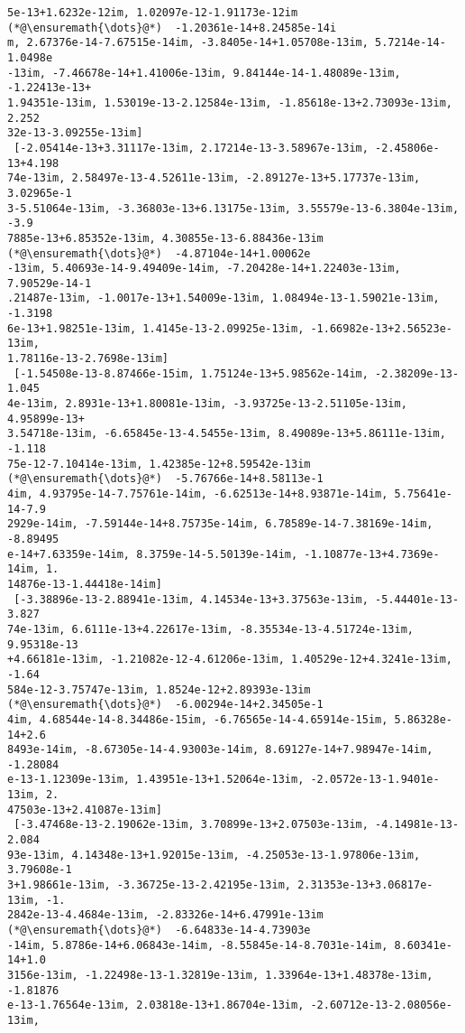 \documentclass[12pt,a4paper]{article}
\begin{document}
\begin{lstlisting}
5e-13+1.6232e-12im, 1.02097e-12-1.91173e-12im  (*@\ensuremath{\dots}@*)  -1.20361e-14+8.24585e-14i
m, 2.67376e-14-7.67515e-14im, -3.8405e-14+1.05708e-13im, 5.7214e-14-1.0498e
-13im, -7.46678e-14+1.41006e-13im, 9.84144e-14-1.48089e-13im, -1.22413e-13+
1.94351e-13im, 1.53019e-13-2.12584e-13im, -1.85618e-13+2.73093e-13im, 2.252
32e-13-3.09255e-13im]        
 [-2.05414e-13+3.31117e-13im, 2.17214e-13-3.58967e-13im, -2.45806e-13+4.198
74e-13im, 2.58497e-13-4.52611e-13im, -2.89127e-13+5.17737e-13im, 3.02965e-1
3-5.51064e-13im, -3.36803e-13+6.13175e-13im, 3.55579e-13-6.3804e-13im, -3.9
7885e-13+6.85352e-13im, 4.30855e-13-6.88436e-13im  (*@\ensuremath{\dots}@*)  -4.87104e-14+1.00062e
-13im, 5.40693e-14-9.49409e-14im, -7.20428e-14+1.22403e-13im, 7.90529e-14-1
.21487e-13im, -1.0017e-13+1.54009e-13im, 1.08494e-13-1.59021e-13im, -1.3198
6e-13+1.98251e-13im, 1.4145e-13-2.09925e-13im, -1.66982e-13+2.56523e-13im, 
1.78116e-13-2.7698e-13im]    
 [-1.54508e-13-8.87466e-15im, 1.75124e-13+5.98562e-14im, -2.38209e-13-1.045
4e-13im, 2.8931e-13+1.80081e-13im, -3.93725e-13-2.51105e-13im, 4.95899e-13+
3.54718e-13im, -6.65845e-13-4.5455e-13im, 8.49089e-13+5.86111e-13im, -1.118
75e-12-7.10414e-13im, 1.42385e-12+8.59542e-13im  (*@\ensuremath{\dots}@*)  -5.76766e-14+8.58113e-1
4im, 4.93795e-14-7.75761e-14im, -6.62513e-14+8.93871e-14im, 5.75641e-14-7.9
2929e-14im, -7.59144e-14+8.75735e-14im, 6.78589e-14-7.38169e-14im, -8.89495
e-14+7.63359e-14im, 8.3759e-14-5.50139e-14im, -1.10877e-13+4.7369e-14im, 1.
14876e-13-1.44418e-14im]     
 [-3.38896e-13-2.88941e-13im, 4.14534e-13+3.37563e-13im, -5.44401e-13-3.827
74e-13im, 6.6111e-13+4.22617e-13im, -8.35534e-13-4.51724e-13im, 9.95318e-13
+4.66181e-13im, -1.21082e-12-4.61206e-13im, 1.40529e-12+4.3241e-13im, -1.64
584e-12-3.75747e-13im, 1.8524e-12+2.89393e-13im  (*@\ensuremath{\dots}@*)  -6.00294e-14+2.34505e-1
4im, 4.68544e-14-8.34486e-15im, -6.76565e-14-4.65914e-15im, 5.86328e-14+2.6
8493e-14im, -8.67305e-14-4.93003e-14im, 8.69127e-14+7.98947e-14im, -1.28084
e-13-1.12309e-13im, 1.43951e-13+1.52064e-13im, -2.0572e-13-1.9401e-13im, 2.
47503e-13+2.41087e-13im]     
 [-3.47468e-13-2.19062e-13im, 3.70899e-13+2.07503e-13im, -4.14981e-13-2.084
93e-13im, 4.14348e-13+1.92015e-13im, -4.25053e-13-1.97806e-13im, 3.79608e-1
3+1.98661e-13im, -3.36725e-13-2.42195e-13im, 2.31353e-13+3.06817e-13im, -1.
2842e-13-4.4684e-13im, -2.83326e-14+6.47991e-13im  (*@\ensuremath{\dots}@*)  -6.64833e-14-4.73903e
-14im, 5.8786e-14+6.06843e-14im, -8.55845e-14-8.7031e-14im, 8.60341e-14+1.0
3156e-13im, -1.22498e-13-1.32819e-13im, 1.33964e-13+1.48378e-13im, -1.81876
e-13-1.76564e-13im, 2.03818e-13+1.86704e-13im, -2.60712e-13-2.08056e-13im, 

\end{lstlisting}
\end{document}
